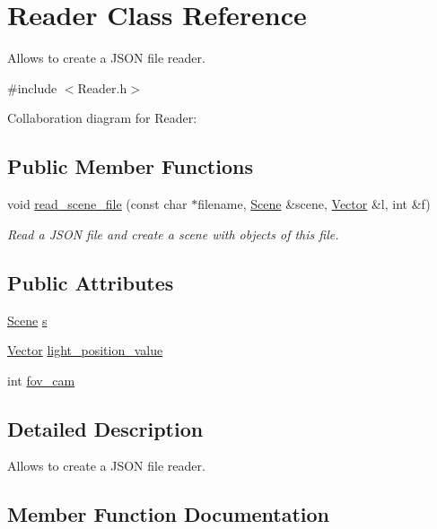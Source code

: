 \hypertarget{classReader}{}\section{Reader Class Reference}
\label{classReader}


Allows to create a J\+S\+ON file reader.  




{\ttfamily \#include $<$Reader.\+h$>$}



Collaboration diagram for Reader\+:
\subsection*{Public Member Functions}
\begin{DoxyCompactItemize}
\item 
void \hyperlink{classReader_aa518eb8a4a05f69e9efc9bf4589535a7}{read\+\_\+scene\+\_\+file} (const char $\ast$filename, \hyperlink{classScene}{Scene} \&scene, \hyperlink{classVector}{Vector} \&l, int \&f)
\begin{DoxyCompactList}\small\item\em Read a J\+S\+ON file and create a scene with objects of this file. \end{DoxyCompactList}\end{DoxyCompactItemize}
\subsection*{Public Attributes}
\begin{DoxyCompactItemize}
\item 
\hyperlink{classScene}{Scene} \hyperlink{classReader_a84df722b393b595cded39ae6654febc5}{s}
\item 
\hyperlink{classVector}{Vector} \hyperlink{classReader_afaf8e383240d7b48bdb85aeb41bdafa5}{light\+\_\+position\+\_\+value}
\item 
int \hyperlink{classReader_a64e54cbd23dd64f4a46e9c0c7218b5fe}{fov\+\_\+cam}
\end{DoxyCompactItemize}


\subsection{Detailed Description}
Allows to create a J\+S\+ON file reader. 

\subsection{Member Function Documentation}
\mbox{\label{classReader_aa518eb8a4a05f69e9efc9bf4589535a7}} 
